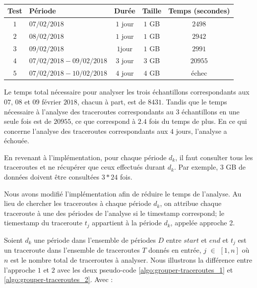 \begin{table}[H]
\centering
\captionsetup{justification=centering}
	\begin{tabular}{c lccc}
		
		\textbf{Test}&\textbf{Période} &\textbf{Durée}  & \textbf{Taille}   & \textbf{Temps (secondes)} \\ \hline
		
		$ 1 $&$ 07/02/2018 $&$ 1 $ jour&$ 1 $ GB& $ 2498 $\\ \hline
		$ 2 $&$ 08/02/2018 $&$ 1 $ jour&$ 1 $ GB& $ 2942 $\\ \hline
	$ 	3 $&$ 09/02/2018 $&$ 1  $jour& $ 1 $ GB& $ 2991 $\\ \hline
		$ 4 $&$ 07/02/2018 - 09/02/2018 $&$ 3 $ jour& $ 3 $ GB& $ 20955 $\\ \hline
		$ 5 $&$ 07/02/2018 - 10/02/2018 $&$ 4 $ jour& $ 4 $ GB & échec \\ \hline
	\end{tabular}
	\caption{}
	\label{tab:spark-timing}
\end{table}

Le temps total nécessaire pour analyser les trois échantillons correspondants aux  $ 07 $, $ 08 $ et $ 09 $ février $ 2018 $, chacun à part,  est de $ 8431 $. Tandis que le temps nécessaire à l'analyse des traceroutes correspondants au 3 échantillons en une seule fois est de $20955$, ce que correspond à $ 2.4 $ fois du temps de plus.
En ce qui concerne l'analyse des traceroutes correspondants aux $ 4 $ jours,  l'analyse a échouée. 

En revenant à l'implémentation, pour chaque période $d_k$, il faut consulter tous les traceroutes et ne récupérer que ceux effectués durant $d_k$. Par exemple, 3 GB de données doivent être consultées $ 3 * 24 $ fois. 


Nous avons modifié l'implémentation afin de réduire le temps de l'analyse. Au lieu de chercher les traceroutes à chaque période $d_k$,  on attribue chaque traceroute à une des périodes de l'analyse si le timestamp correspond; le tiemestamp du traceroute $t_{j}$ appartient à la période $d_k$, appelée approche 2.


Soient $d_k$ une période dans l'ensemble de périodes $D$  entre $ start $ et $ end $ et $t_{j}$ est un traceroute dans l'ensemble de traceroutes $T$ donnés en entrée, $j$ $\in$ $[1, n]$ où $n$ est le nombre total de traceroutes à analyser. Nous illustrons la différence entre l'approche $ 1 $ et $ 2 $ avec les deux pseudo-code \ref{algo:grouper-traceroutes_1} et 	\ref{algo:grouper-traceroutes_2}. Avec :

